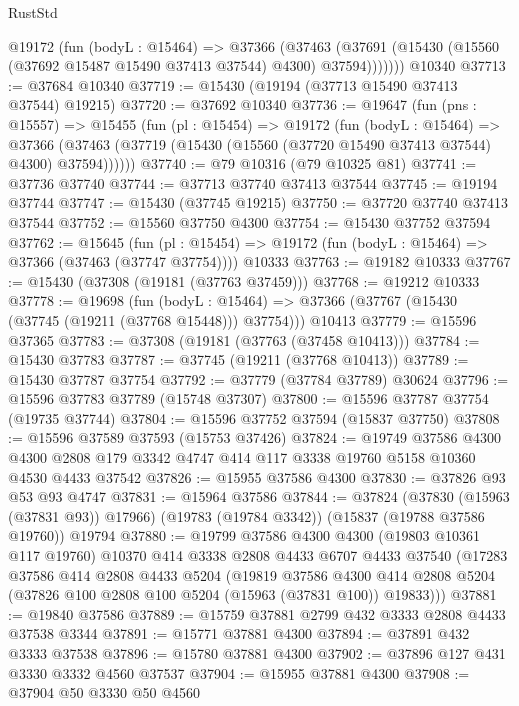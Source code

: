 \begin{lexlean}{RustStd}
\begin{coremodule}
{\begin{coremodule}
{{{{{{{{{{{{{{{{{{{{{{{{{{{{{{{{{{{{{{{{{{{{{{{{{{{{{{{{{{{{        @19172
          (fun (bodyL : @15464) =>
          @37366
            (@37463
              (@37691 (@15430 (@15560 (@37692 @15487 @15490 @37413 @37544) @4300) @37594)))))))
    @10340
@37713 := @37684 @10340
@37719 := @15430 (@19194 (@37713 @15490 @37413 @37544) @19215)
@37720 := @37692 @10340
@37736 := @19647
    (fun (pns : @15557) =>
    @15455
      (fun (pl : @15454) =>
      @19172
        (fun (bodyL : @15464) =>
        @37366 (@37463 (@37719 (@15430 (@15560 (@37720 @15490 @37413 @37544) @4300) @37594))))))
@37740 := @79 @10316 (@79 @10325 @81)
@37741 := @37736 @37740
@37744 := @37713 @37740 @37413 @37544
@37745 := @19194 @37744
@37747 := @15430 (@37745 @19215)
@37750 := @37720 @37740 @37413 @37544
@37752 := @15560 @37750 @4300
@37754 := @15430 @37752 @37594
@37762 := @15645
    (fun (pl : @15454) => @19172 (fun (bodyL : @15464) => @37366 (@37463 (@37747 @37754))))
    @10333
@37763 := @19182 @10333
@37767 := @15430 (@37308 (@19181 (@37763 @37459)))
@37768 := @19212 @10333
@37778 := @19698
    (fun (bodyL : @15464) => @37366 (@37767 (@15430 (@37745 (@19211 (@37768 @15448))) @37754)))
    @10413
@37779 := @15596 @37365
@37783 := @37308 (@19181 (@37763 (@37458 @10413)))
@37784 := @15430 @37783
@37787 := @37745 (@19211 (@37768 @10413))
@37789 := @15430 @37787 @37754
@37792 := @37779 (@37784 @37789) @30624
@37796 := @15596 @37783 @37789 (@15748 @37307)
@37800 := @15596 @37787 @37754 (@19735 @37744)
@37804 := @15596 @37752 @37594 (@15837 @37750)
@37808 := @15596 @37589 @37593 (@15753 @37426)
@37824 := @19749
    @37586
    @4300
    @4300
    @2808
    @179
    @3342
    @4747
    @414
    @117
    @3338
    @19760
    @5158
    @10360
    @4530
    @4433
    @37542
@37826 := @15955 @37586 @4300
@37830 := @37826 @93 @53 @93 @4747
@37831 := @15964 @37586
@37844 := @37824
    (@37830 (@15963 (@37831 @93)) @17966)
    (@19783 (@19784 @3342))
    (@15837 (@19788 @37586 @19760))
    @19794
@37880 := @19799
    @37586
    @4300
    @4300
    (@19803 @10361 @117 @19760)
    @10370
    @414
    @3338
    @2808
    @4433
    @6707
    @4433
    @37540
    (@17283
      @37586
      @414
      @2808
      @4433
      @5204
      (@19819
        @37586
        @4300
        @414
        @2808
        @5204
        (@37826 @100 @2808 @100 @5204 (@15963 (@37831 @100)) @19833)))
@37881 := @19840 @37586
@37889 := @15759 @37881 @2799 @432 @3333 @2808 @4433 @37538 @3344
@37891 := @15771 @37881 @4300
@37894 := @37891 @432 @3333 @37538
@37896 := @15780 @37881 @4300
@37902 := @37896 @127 @431 @3330 @3332 @4560 @37537
@37904 := @15955 @37881 @4300
@37908 := @37904 @50 @3330 @50 @4560
}}}}}}}}}}}}}}}}}}}}}}}}}}}}}}}}}}}}}}}}}}}}}}}}}}}}}}}}}}}}
\end{coremodule}}
\end{coremodule}
\end{lexlean}
